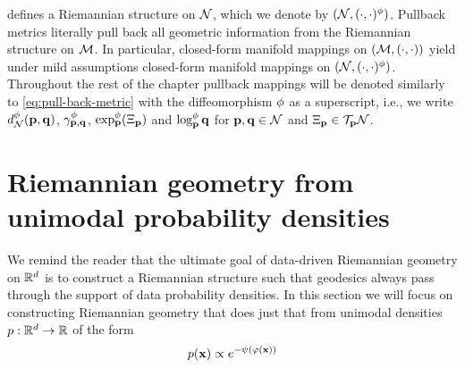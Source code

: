 defines a Riemannian structure on $\mathcal{N}$, which we denote by $(\mathcal{N}, (\cdot,\cdot)^\phi)$. 
Pullback metrics literally pull back all geometric information from the Riemannian structure on $\mathcal{M}$. In particular, closed-form manifold mappings on $(\mathcal{M}, (\cdot,\cdot))$ yield under mild assumptions closed-form manifold mappings on $(\mathcal{N}, (\cdot,\cdot)^\phi)$.
Throughout the rest of the chapter pullback mappings will be denoted similarly to \ref{eq:pull-back-metric} with the diffeomorphism $\phi$ as a superscript, i.e., we write $d^\phi_{\mathcal{N}}(\mathbf{p}, \mathbf{q})$, $\gamma^\phi_{\mathbf{p}, \mathbf{q}}$, $\exp^\phi_{\mathbf{p}} (\Xi_{\mathbf{p}})$ and $\log^\phi_{\mathbf{p}} \mathbf{q}$ 
for $\mathbf{p},\mathbf{q} \in \mathcal{N}$ and $\Xi_{\mathbf{p}} \in \mathcal{T}_{\mathbf{p}} \mathcal{N}$. 

\section{Riemannian geometry from unimodal probability densities}
\label{sec:unimodal-riemannian geometry}

We remind the reader that the ultimate goal of data-driven Riemannian geometry on $\mathbb{R}^d$ is to construct a Riemannian structure such that geodesics always pass through the support of data probability densities. In this section we will focus on constructing Riemannian geometry that does just that from unimodal densities $p:\mathbb{R}^d\to \mathbb{R}$ of the form
\begin{equation}
    p(\mathbf{x}) \propto e^{- \psi(\varphi(\mathbf{x}))}
    \label{eq:stroco-diffeo-density}
\end{equation}

